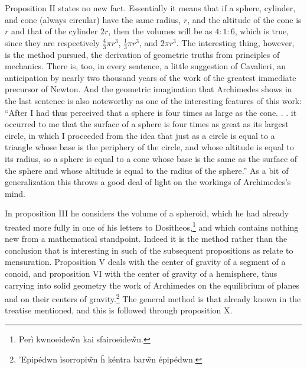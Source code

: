 \documentclass[12pt]{article}
\begin{document}
Proposition II states no new fact. Essentially it means that if a
sphere, cylinder, and cone (always circular) have the same radius,
$r$, and the altitude of the cone is $r$ and that of the cylinder
$2r$, then the volumes will be as $4 : 1 : 6$, which is true, since
they are respectively $\frac{4}{3}\pi r^3$, $\frac{1}{3}\pi r^3$, and
$2\pi r^3$.  The interesting thing, however, is the method pursued,
the derivation of geometric truths from principles of mechanics. There
is, too, in every sentence, a little suggestion of Cavalieri, an
anticipation by nearly two thousand years of the work of the greatest
immediate precursor of Newton. And the geometric imagination that
Archimedes shows in the last sentence is also noteworthy as one of the
interesting features of this work: ``After I had thus perceived that a
sphere is four times as large as the cone. . . it occurred to me that
the surface of a sphere is four times as great as its largest circle,
in which I proceeded from the idea that just as a circle is equal to a
triangle whose base is the periphery of the circle, and whose altitude
is equal to its radius, so a sphere is equal to a cone whose base is
the same as the surface of the sphere and whose altitude is equal to
the radius of the sphere.'' As a bit of generalization this throws a
good deal of light on the workings of Archimedes's mind.

In proposition III he considers the volume of a spheroid, which he had
already treated more fully in one of his letters to
Dositheos,\footnote{ Per\`i kwnoeide\~wn kai
sfairoeide\~wn.} and which contains nothing new from a mathematical
standpoint. Indeed it is the method rather than the conclusion that is
interesting in such of the subsequent propositions as relate to
mensuration. Proposition V deals with the center of gravity of a
segment of a conoid, and proposition VI with the center of gravity of
a hemisphere, thus carrying into solid geometry the work of Archimedes
on the equilibrium of planes and on their centers of
gravity.\footnote{ 'Epip\'edwn \`isorropi\~wn
\^h k\'entra bar\~wn \'epip\'edwn.} The general method is that already
known in the treatise mentioned, and this is followed through
proposition X.
\end{document}
